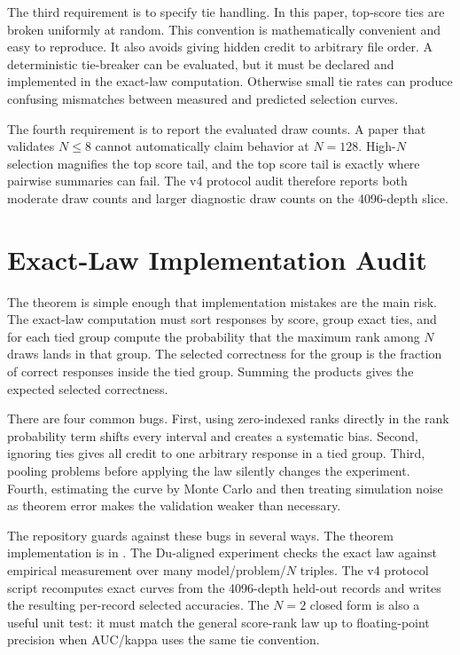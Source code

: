 The third requirement is to specify tie handling. In this paper, top-score ties
are broken uniformly at random. This convention is mathematically convenient
and easy to reproduce. It also avoids giving hidden credit to arbitrary file
order. A deterministic tie-breaker can be evaluated, but it must be declared
and implemented in the exact-law computation. Otherwise small tie rates can
produce confusing mismatches between measured and predicted selection curves.

The fourth requirement is to report the evaluated draw counts. A paper that
validates $N\leq 8$ cannot automatically claim behavior at $N=128$. High-$N$
selection magnifies the top score tail, and the top score tail is exactly
where pairwise summaries can fail. The v4 protocol audit therefore reports both
moderate draw counts and larger diagnostic draw counts on the 4096-depth slice.

\section{Exact-Law Implementation Audit}
\label{app:implementation-audit}

The theorem is simple enough that implementation mistakes are the main risk.
The exact-law computation must sort responses by score, group exact ties, and
for each tied group compute the probability that the maximum rank among $N$
draws lands in that group. The selected correctness for the group is the
fraction of correct responses inside the tied group. Summing the products gives
the expected selected correctness.

There are four common bugs. First, using zero-indexed ranks directly in the
rank probability term shifts every interval and creates a systematic bias.
Second, ignoring ties gives all credit to one arbitrary response in a tied
group. Third, pooling problems before applying the law silently changes the
experiment. Fourth, estimating the curve by Monte Carlo and then treating
simulation noise as theorem error makes the validation weaker than necessary.

The repository guards against these bugs in several ways. The theorem
implementation is in . The Du-aligned experiment checks
the exact law against empirical measurement over many model/problem/$N$ triples.
The v4 protocol script recomputes exact curves from the 4096-depth held-out records and
writes the resulting per-record selected accuracies. The $N=2$ closed form is
also a useful unit test: it must match the general score-rank law up to
floating-point precision when AUC/kappa uses the same tie convention.

